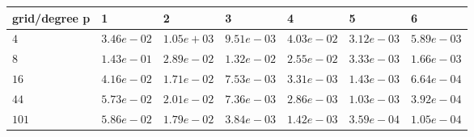 \begin{tabular}{lllllll}
\hline
 grid/degree p   & 1          & 2          & 3          & 4          & 5          & 6          \\
\hline
 $4$             & $3.46e-02$ & $1.05e+03$ & $9.51e-03$ & $4.03e-02$ & $3.12e-03$ & $5.89e-03$ \\
 $8$             & $1.43e-01$ & $2.89e-02$ & $1.32e-02$ & $2.55e-02$ & $3.33e-03$ & $1.66e-03$ \\
 $16$            & $4.16e-02$ & $1.71e-02$ & $7.53e-03$ & $3.31e-03$ & $1.43e-03$ & $6.64e-04$ \\
 $44$            & $5.73e-02$ & $2.01e-02$ & $7.36e-03$ & $2.86e-03$ & $1.03e-03$ & $3.92e-04$ \\
 $101$           & $5.86e-02$ & $1.79e-02$ & $3.84e-03$ & $1.42e-03$ & $3.59e-04$ & $1.05e-04$ \\
\hline
\end{tabular}